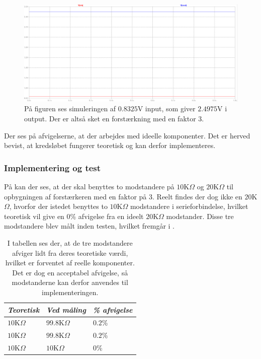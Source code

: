 \begin{figure}[H]
	\centering
	\includegraphics[scale=0.3]{figures/cProblemloesning/Forstaerker_faktor3_simulering.PNG}
	\caption{På figuren ses simuleringen af $0.8325$V input, som giver $2.4975$V i output. Der er altså sket en forstærkning med en faktor $3$.}
	\label{fig:faktor3_simulering}
\end{figure}
\noindent Der ses på afvigelserne, at der arbejdes med ideelle komponenter. Det er herved bevist, at kredsløbet fungerer teoretisk og kan derfor implementeres.

\subsubsection{Implementering og test}
På  kan der ses, at der skal benyttes to modstandere på $10$K$\Omega$ og $20$K$\Omega$ til opbygningen af forstærkeren med en faktor på 3. Reelt findes der dog ikke en $20$K$\Omega$, hvorfor der istedet benyttes to $10$K$\Omega$ modstandere i serieforbindelse, hvilket teoretisk vil give en $0$\% afvigelse fra en ideelt $20$K$\Omega$ modstander. Disse tre modstandere blev målt inden testen, hvilket fremgår i .
\begin{table}[H]
	\centering
	\begin{tabular}{|l|l|l|}
		\hline
		\textit{Teoretisk}  & \textit{Ved måling} & \textit{\% afvigelse} \\ \hline
		$10$K$\Omega$       & $99.8$K$\Omega$     & $0.2$\%               \\ \hline
		$10$K$\Omega$       & $99.8$K$\Omega$     & $0.2$\%               \\ \hline
		$10$K$\Omega$       & $10$K$\Omega$       & $0$\%               \\ \hline
	\end{tabular}
	\caption{I tabellen ses der, at de tre modstandere afviger lidt fra deres teoretiske værdi, hvilket er forventet af reelle komponenter. Det er dog en acceptabel afvigelse, så modstanderne kan derfor anvendes til implementeringen.}
	\label{Tab:modstand_faktor18}
\end{table}

